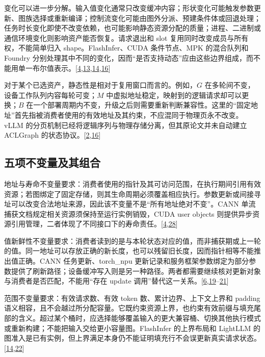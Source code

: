\documentclass[
  UTF8,
  zihao=5]{ctexart}
\begin{document}
变化可以进一步分解。输入值变化通常只改变缓冲内容；形状变化可能触发参数更新、图族选择或重新编译；控制流变化可能由图外分派、预建条件体或回退处理；任务时长变化即使不改变依赖，也可能影响静态资源分配的质量；进程、二进制或通信环境变化则影响资产能否恢复。请求退出和
slot 复用同时改变成员与所有权，不能简单归入 shape。FlashInfer、CUDA
条件节点、MPK 的混合队列和 Foundry
分别处理其中不同的变化，因而``是否支持动态''应由这些边界组成，而不能用单一布尔值表示。{[}\protect\hyperlink{ref-nvidia2025cudaguide}{4},\protect\hyperlink{ref-cheng2026mpk}{13},\protect\hyperlink{ref-ye2025flashinfer}{14},\protect\hyperlink{ref-liu2026foundry}{16}{]}

对于某个已选资产，静态性是相对于复用窗口而言的。例如，\(G\)
在多轮间不变，设备工作队列内容每轮可变；\(M\)
中虚拟地址稳定，映射到的逻辑请求却可以更换；\(B\)
在一个部署周期内不变，升级之后则需要重新判断兼容性。这里的``固定地址''首先指被消费者使用的有效地址及其约束，不应混同于物理页永不改变。vLLM
的分页机制已经将逻辑序列与物理存储分离，但其原论文并未自动建立 ACLGraph
的状态协议。{[}\protect\hyperlink{ref-kwon2023vllm}{2},\protect\hyperlink{ref-liu2026foundry}{16}{]}

\hypertarget{ux4e94ux9879ux4e0dux53d8ux91cfux53caux5176ux7ec4ux5408}{%
\subsection{五项不变量及其组合}\label{ux4e94ux9879ux4e0dux53d8ux91cfux53caux5176ux7ec4ux5408}}

地址与寿命不变量要求：消费者使用的指针及其可访问范围，在执行期间引用有效资源；若图绑定了固定存储，则其生命周期必须覆盖相应执行。参数更新或间接寻址可以改变合法地址来源，因此该不变量不是``所有地址绝对不变''。CANN
单流捕获文档规定相关资源须保持至运行实例销毁，CUDA user objects
则提供异步资源引用管理，二者体现了不同接口下的寿命责任。{[}\protect\hyperlink{ref-nvidia2025cudaguide}{4},\protect\hyperlink{ref-cann910single}{28}{]}

值新鲜性不变量要求：消费者读到的是与本轮状态对应的值，而非捕获期或上一轮的值。同一地址可以存放正确的新长度，也可以残留旧长度，因而指针相等不能推出值正确。CANN
任务更新、torch\_npu
更新记录和服务框架参数绑定为部分参数提供了刷新路径；设备缓冲写入则是另一种路径。两者都需要继续核对更新对象与消费者是否匹配，不能用``存在
update
调用''替代这一关系。{[}\protect\hyperlink{ref-cann910update}{6},\protect\hyperlink{ref-torchnpu2026graphs}{19}--\protect\hyperlink{ref-sglang2026impl}{21}{]}

范围不变量要求：有效请求数、有效 token 数、累计边界、上下文上界和
padding
语义相容，且不会越过所分配容量。它既约束资源上界，也约束有效前缀与填充尾部的含义。超过某个桶时，应选择能够覆盖输入的更大兼容桶、切换其他执行模式或重新构建；不能把输入交给更小容量图。FlashInfer
的上界布局和 LightLLM
的图准入是已有实例，但上界满足本身仍不能证明填充行不会误更新真实请求状态。{[}\protect\hyperlink{ref-ye2025flashinfer}{14},\protect\hyperlink{ref-lightllm2026code}{22}{]}
\end{document}

